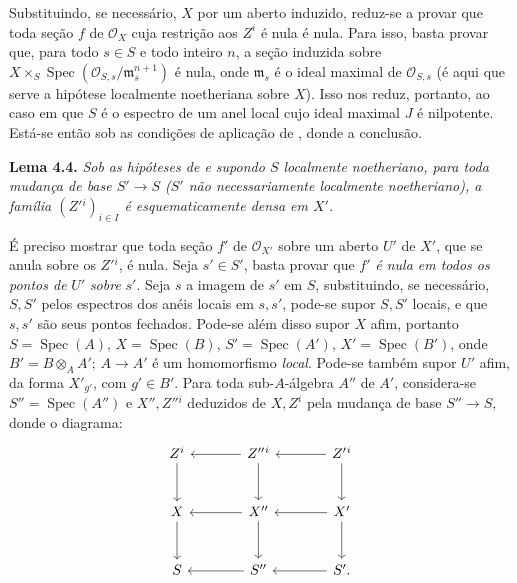 Substituindo, se necessário, \(X\) por um aberto induzido, reduz-se
a provar que toda seção \(f\) de \(\mathscr O_X\) cuja restrição
aos \(Z^i\) é nula é nula. Para isso, basta provar que, para todo
\(s\in S\) e todo inteiro \(n\), a seção induzida sobre
\(X\times_S\operatorname{Spec}(\mathscr O_{S,s}/\mathfrak m_s^{n+1})\)
é nula, onde \(\mathfrak m_s\) é o ideal maximal de
\(\mathscr O_{S,s}\) (é aqui que serve a hipótese localmente
noetheriana sobre \(X\)). Isso nos reduz, portanto, ao caso em que
\(S\) é o espectro de um anel local cujo ideal maximal \(J\) é
nilpotente. Está-se então sob as condições de aplicação de
, donde a conclusão.

\medskip
\noindent{}\textbf{Lema 4.4.}
\textit{Sob as hipóteses de
 e supondo \(S\)
localmente noetheriano, para toda mudança de base \(S'\to S\)
(\(S'\) não necessariamente localmente noetheriano), a família
\((Z'{}^i)_{i\in I}\) é esquematicamente densa em \(X'\).}

É preciso mostrar que toda seção \(f'\) de \(\mathscr O_{X'}\)
sobre um aberto \(U'\) de \(X'\), que se anula sobre os \(Z'{}^i\),
é nula. Seja \(s'\in S'\), basta provar que \(f'\) \emph{é nula
em todos os pontos de} \(U'\) \emph{sobre} \(s'\). Seja \(s\)
a imagem de \(s'\) em \(S\), substituindo, se necessário,
\(S,S'\) pelos espectros dos anéis locais em \(s,s'\), pode-se
supor \(S,S'\) locais, e que \(s,s'\) são seus pontos fechados.
Pode-se além disso supor \(X\) afim, portanto
\(S=\operatorname{Spec}(A)\), \(X=\operatorname{Spec}(B)\),
\(S'=\operatorname{Spec}(A')\), \(X'=\operatorname{Spec}(B')\),
onde \(B'=B\otimes_A A'\); \(A\to A'\) é um homomorfismo
\emph{local}. Pode-se também supor \(U'\) afim, da forma
\(X'_{g'}\), com \(g'\in B'\). Para toda sub-\(A\)-álgebra
\(A''\) de \(A'\), considera-se \(S''=\operatorname{Spec}(A'')\)
e \(X'',Z''{}^i\) deduzidos de \(X,Z^i\) pela mudança de base
\(S''\to S\), donde o diagrama:
\[
\begin{tikzcd}[column sep=large,row sep=large]
  Z^i \arrow[d] & Z''{}^i \arrow[l]\arrow[d]
    & Z'{}^i \arrow[l]\arrow[d] \\
  X \arrow[d] & X'' \arrow[l]\arrow[d] & X' \arrow[l]\arrow[d] \\
  S & S'' \arrow[l] & S' \arrow[l].
\end{tikzcd}
\]

